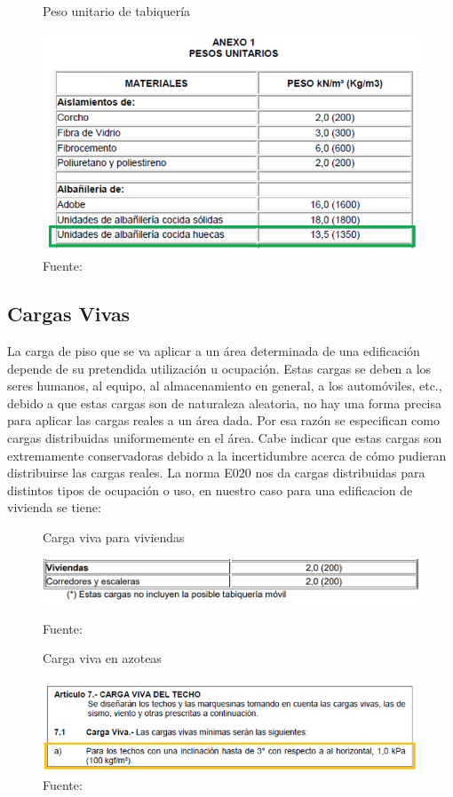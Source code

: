 \begin{figure}[h!]
    \centering
    \caption{Peso unitario de tabiquería}
    \includegraphics[scale=0.7]{IMAGENES/3.PNG}
    \caption*{\small Fuente: \it \cite{E-020}}
    \label{fig:my_label}
\end{figure}

\newpage

\subsection{Cargas Vivas}
La carga de piso que se va aplicar a un área determinada de una edificación depende de su pretendida utilización u ocupación. Estas cargas se deben a los seres humanos, al equipo, al almacenamiento en general, a los automóviles, etc., debido a que estas cargas son de naturaleza aleatoria, no hay una forma precisa para aplicar las cargas reales a un área dada. Por esa razón se especifican como cargas distribuidas uniformemente en el área. Cabe indicar que estas cargas son extremamente conservadoras debido a la incertidumbre acerca de cómo pudieran distribuirse las cargas reales. La norma E020 nos da cargas distribuidas para distintos tipos de ocupación o uso, en nuestro caso para una edificacion de vivienda se tiene:  

\begin{figure}[h]
    \centering
    \caption{Carga viva para viviendas}
    \includegraphics[scale=0.8]{IMAGENES/4.PNG}
    \label{fig:my_label}
    \caption*{\small Fuente: \it \cite{E-020}}
\end{figure}

\begin{figure}[h]
    \centering
    \caption{Carga viva en azoteas}
    \includegraphics[scale=1]{IMAGENES/7.PNG}
    \caption*{\small Fuente: \it \cite{E-020}}
\end{figure}

\newpage